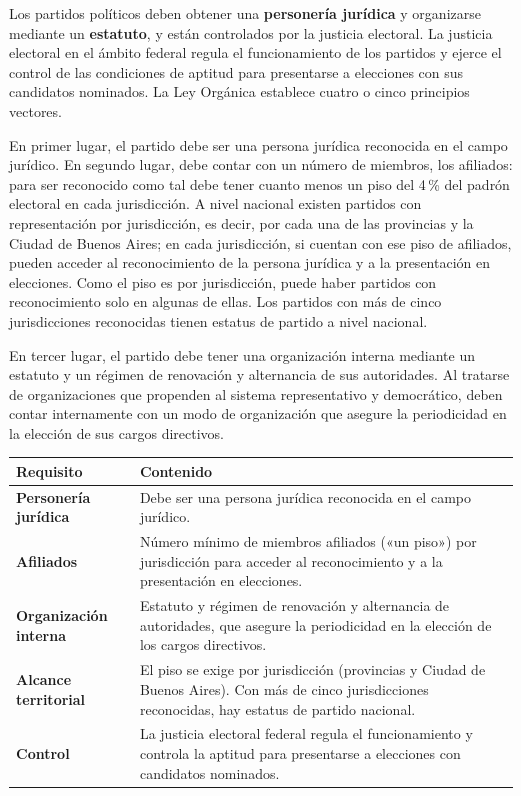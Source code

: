 \documentclass[12pt,oneside]{book}
\begin{document}
Los partidos políticos deben obtener una \textbf{personería jurídica} y organizarse mediante un \textbf{estatuto}, y están controlados por la justicia electoral. La justicia electoral en el ámbito federal regula el funcionamiento de los partidos y ejerce el control de las condiciones de aptitud para presentarse a elecciones con sus candidatos nominados. La Ley Orgánica establece cuatro o cinco principios vectores.

En primer lugar, el partido debe ser una persona jurídica reconocida en el campo jurídico. En segundo lugar, debe contar con un número de miembros, los afiliados: para ser reconocido como tal debe tener cuanto menos un piso del 4\,\% del padrón electoral en cada jurisdicción. A nivel nacional existen partidos con representación por jurisdicción, es decir, por cada una de las provincias y la Ciudad de Buenos Aires; en cada jurisdicción, si cuentan con ese piso de afiliados, pueden acceder al reconocimiento de la persona jurídica y a la presentación en elecciones. Como el piso es por jurisdicción, puede haber partidos con reconocimiento solo en algunas de ellas. Los partidos con más de cinco jurisdicciones reconocidas tienen estatus de partido a nivel nacional.

En tercer lugar, el partido debe tener una organización interna mediante un estatuto y un régimen de renovación y alternancia de sus autoridades. Al tratarse de organizaciones que propenden al sistema representativo y democrático, deben contar internamente con un modo de organización que asegure la periodicidad en la elección de sus cargos directivos.

\begin{table}[H]
\centering
\begin{tabularx}{\textwidth}{>{\raggedright\arraybackslash}p{} >{\raggedright\arraybackslash}X}
\toprule
\textbf{Requisito} & \textbf{Contenido} \\
\midrule
\textbf{Personería jurídica} & Debe ser una persona jurídica reconocida en el campo jurídico. \\
\textbf{Afiliados} & Número mínimo de miembros afiliados («un piso») por jurisdicción para acceder al reconocimiento y a la presentación en elecciones. \\
\textbf{Organización interna} & Estatuto y régimen de renovación y alternancia de autoridades, que asegure la periodicidad en la elección de los cargos directivos. \\
\textbf{Alcance territorial} & El piso se exige por jurisdicción (provincias y Ciudad de Buenos Aires). Con más de cinco jurisdicciones reconocidas, hay estatus de partido nacional. \\
\textbf{Control} & La justicia electoral federal regula el funcionamiento y controla la aptitud para presentarse a elecciones con candidatos nominados. \\
\bottomrule
\end{tabularx}
\end{table}
\end{document}
